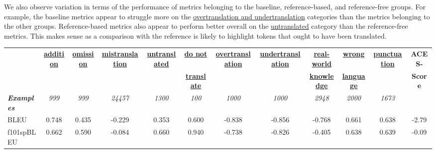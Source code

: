 \documentclass[11pt]{article}
\begin{document}
We also observe variation in terms of the performance of metrics belonging to the baseline, reference-based, and reference-free groups. For example, the baseline metrics appear to struggle more on the \hyperref[sec:overtranslation_undertranslation]{overtranslation and undertranslation} categories than the metrics belonging to the other groups. Reference-based metrics also appear to perform better overall on the \hyperref[sec:untranslated]{untranslated} category than the reference-free metrics. This makes sense as a comparison with the reference is likely to highlight tokens that ought to have been translated.
\begin{sidewaystable*}[ht]
\small
\setlength{\tabcolsep}{3.75pt}
\centering
\begin{tabular}{@{}lccccccccccc@{}}
\toprule
 & \hyperref[sec:addition-omission]{\textbf{addition}} & \hyperref[sec:addition-omission]{\textbf{omission}} & \hyperref[sec:source-disambig]{\textbf{mistranslation}} & \hyperref[sec:untranslated]{\textbf{untranslated}} & \hyperref[sec:do-not-translate]{\textbf{do not}} & \hyperref[sec:overtranslation_undertranslation]{\textbf{overtranslation}} & \hyperref[sec:overtranslation_undertranslation]{\textbf{undertranslation}} & \hyperref[sec:real-world-knowledge]{\textbf{real-world}} & \hyperref[sec:wrong_language]{\textbf{wrong}} & \hyperref[sec:punctuation]{\textbf{punctuation}} & \textbf{ACES-}\\ 
&  &  &  &  & \hyperref[sec:do-not-translate]{\textbf{translate}} &  &  & \hyperref[sec:real-world-knowledge]{\textbf{knowledge}} & \hyperref[sec:wrong_language]{\textbf{language}} &  & \textbf{Score}\\ 
\midrule
\textit{\textbf{Examples}}     & \textit{999}                 & \textit{999}                 & \textit{24457}                     & \textit{1300}                    & \textit{100}                         & \textit{1000}                       & \textit{1000}                        & \textit{2948}                            & \textit{2000}                      & \textit{1673}                   \\ 
\midrule
BLEU                    & \phantom{-}0.748    & \phantom{-}0.435    & -0.229         & \phantom{-}0.353        & \phantom{-}0.600            & -0.838          & -0.856           & -0.768               & \phantom{-}0.661          & \phantom{-}0.638       & -2.79      \\
f101spBLEU              & \phantom{-}0.662    & \phantom{-}0.590    & -0.084         & \phantom{-}0.660        & \phantom{-}0.940            & -0.738          & -0.826           & -0.405               & \phantom{-}0.638          & \phantom{-}0.639       & -0.09      \\

\end{tabular}
\end{sidewaystable*}
\end{document}
